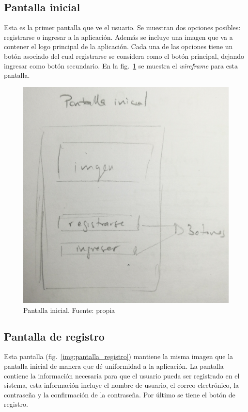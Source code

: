 \documentclass[12pt,letterpaper]{article}
\begin{document}
\subsection{Pantalla inicial}
Esta es la primer pantalla que ve el usuario. Se muestran dos opciones posibles: registrarse o ingresar a la aplicación. Además se incluye una imagen que va a contener el logo principal de la aplicación. Cada una de las opciones tiene un botón asociado del cual registrarse se considera como el botón principal, dejando ingresar como botón secundario. En la fig.~\ref{img:pantalla_inicial} se muestra el \textit{wireframe} para esta pantalla.

\begin{figure}[h!]
	\begin{center}
		\includegraphics[scale=0.07]{pantalla_inicial.jpg}
		\caption{Pantalla inicial. Fuente: propia}
		\label{img:pantalla_inicial}
	\end{center}
\end{figure}

\subsection{Pantalla de registro}
Esta pantalla (fig.~\ref{img:pantalla_registro}) mantiene la misma imagen que la pantalla inicial de manera que dé uniformidad a la aplicación. La pantalla contiene la información necesaria para que el usuario pueda ser registrado en el sistema, esta información incluye el nombre de usuario, el correo electrónico, la contraseña y la confirmación de la contraseña. Por último se tiene el botón de registro.
\end{document}

